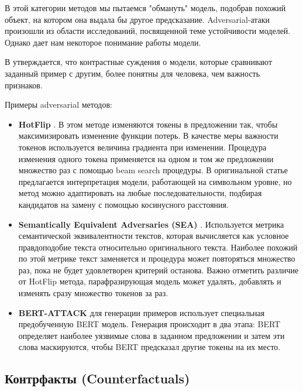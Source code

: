 В этой категории методов мы пытаемся "обмануть" модель, подобрав похожий объект, на котором она выдала бы другое предсказание. Adversarial-атаки произошли из области исследований, посвященной теме устойчивости моделей. Однако дает нам некоторое понимание работы модели.

В \cite{millerExplanationArtificialIntelligence2019} утверждается, что контрастные суждения о модели, которые сравнивают заданный пример с другим, более понятны для человека, чем важность признаков.

Примеры adversarial методов:
\begin{itemize}
    \item \textbf{HotFlip} \cite{ebrahimiHotFlipWhiteBoxAdversarial2018}. В этом методе изменяются токены в предложении так, чтобы максимизировать изменение функции потерь. В качестве меры важности токенов используется величина градиента при изменении. Процедура изменения одного токена применяется на одном и том же предложении множество раз с помощью beam search процедуры. В оригинальной статье предлагается интерпретация модели, работающей на символьном уровне, но метод можно адаптировать на любые последовательности, подбирая кандидатов на замену с помощью косинусного расстояния.
    \item \textbf{Semantically Equivalent Adversaries (SEA)} \cite{ribeiroSemanticallyEquivalentAdversarial2018}. Используется метрика семантической эквивалентности текстов, которая вычисляется как условное правдоподобие текста относительно оригинального текста. Наиболее похожий по этой метрике текст заменяется и процедура может повторяться множество раз, пока не будет удовлетворен критерий останова. Важно отметить различие от HotFlip метода, парафразирующая модель может удалять, добавлять и изменять сразу множество токенов за раз.
    \item \textbf{BERT-ATTACK} \cite{liBERTATTACKAdversarialAttack2020} для генерации примеров использует специальная предобученную BERT модель. Генерация происходит в два этапа: BERT определяет наиболее уязвимые слова в заданном предложении и затем эти слова маскируются, чтобы BERT предсказал другие токены на их место. %
\end{itemize}

\vspace{8mm}
\subsection{Контрфакты (Counterfactuals)}

